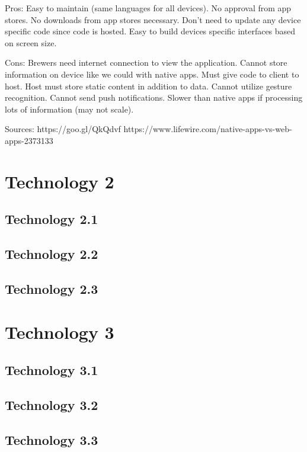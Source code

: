 \documentclass[draftclsnofoot,onecolumn,letterpaper,10pt,compsoc]{IEEEtran}
\begin{document}
    Pros:
        Easy to maintain (same languages for all devices).
        No approval from app stores.
        No downloads from app stores necessary.
        Don't need to update any device specific code since code is hosted.
        Easy to build devices specific interfaces based on screen size.
    
    Cons:
        Brewers need internet connection to view the application.
        Cannot store information on device like we could with native apps.
        Must give code to client to host.
        Host must store static content in addition to data.
        Cannot utilize gesture recognition.
        Cannot send push notifications.
        Slower than native apps if processing lots of information (may not          scale).
    
    Sources:
        https://goo.gl/QkQdvf
        https://www.lifewire.com/native-apps-vs-web-apps-2373133

\section{Technology 2}
	\subsection{Technology 2.1}
	\subsection{Technology 2.2}
	\subsection{Technology 2.3}

\section{Technology 3}
	\subsection{Technology 3.1}
	\subsection{Technology 3.2}
	\subsection{Technology 3.3}

{}

\end{document}
